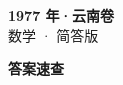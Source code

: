 \documentclass[zihao=-4, a4paper]{ctexart}
\begin{document}
\begin{center}
  {\Large\bfseries 1977 年·云南卷}\\[4pt]
  {\large 数学 · 简答版}
\end{center}
\medskip
{}

\clearpage
{}
\begin{center}{\Large\bfseries 答案速查}\end{center}
\medskip

\end{document}
